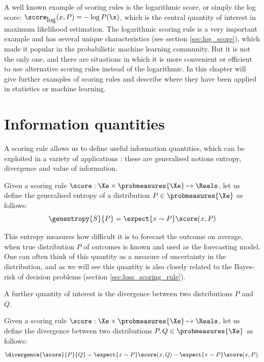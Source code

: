 A well known example of scoring rules is the logarithmic score, or simply the log score: $\score_{\mbox{log}}(x,P) = -\log P(\x)$, which is the central quantity of interest in maximum likelihood estimation. The logarithmic scoring rule is a very important example and has several unique characteristics (see section \ref{sec:log_score}), which made it popular in the probabilistic machine learning community. But it is not the only one, and there are situations in which it is more convenient or efficient to use alternative scoring rules instead of the logarithmic. In this chapter will give further examples of scoring rules and describe where they have been applied in statistics or machine learning.

\section{Information quantities}

A scoring rule allows us to define useful information quantities, which can be exploited in a variety of applications \citep[see also][]{Gneiting2007}: these are generalised notions entropy, divergence and value of information.
\begin{definition}
Given a scoring rule $\score:\Xe\times\probmeasures{\Xe}\mapsto\Reals$, let us define the generalised entropy of a distribution $P\in\probmeasures{\Xe}$ as follows:
\begin{equation}
	\genentropy{S}{P}= \expect{x\sim P} \score(x,P)
\end{equation}
\end{definition}


This entropy measures how difficult it is to forecast the outcome on average, when true distribution $P$ of outcomes is known and used as the forecasting model. One can often think of this quantity as a measure of uncertainty in the distribution, and as we will see this quantity is also closely related to the Bayes-risk of decision problems (section \ref{sec:loss_scoring_rule}).

A further quantity of interest is the divergence between two distributions $P$ and $Q$.

\begin{definition}\label{def:generalised_divergence}
Given a scoring rule $\score:\Xe\times\probmeasures{\Xe}\mapsto\Reals$, let us define the divergence between two distributions $P,Q\in\probmeasures{\Xe}$ as follows:
	\begin{equation}
		\divergence{\score}{P}{Q} = \expect{x\sim P} \score(x,Q) - \expect{x\sim P} \score(x,P)\mbox{.}\label{eqn:def_divergence}
	\end{equation}
\end{definition}

